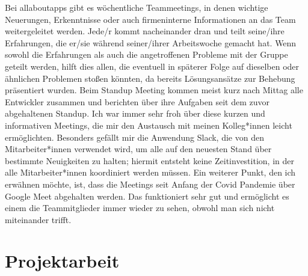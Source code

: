 Bei allaboutapps gibt es wöchentliche Teammeetings, in denen wichtige Neuerungen, Erkenntnisse oder auch firmeninterne Informationen an das Team weitergeleitet werden. Jede/r kommt nacheinander dran und teilt seine/ihre Erfahrungen, die er/sie während seiner/ihrer Arbeitswoche gemacht hat. Wenn sowohl die Erfahrungen als auch die angetroffenen Probleme mit der Gruppe geteilt werden, hilft dies allen, die eventuell in späterer Folge auf dieselben oder ähnlichen Problemen stoßen könnten, da bereits Lösungsansätze zur Behebung präsentiert wurden.\newline
Beim Standup Meeting kommen meist kurz nach Mittag alle Entwickler zusammen und berichten über ihre Aufgaben seit dem zuvor abgehaltenen Standup. Ich war immer sehr froh über diese kurzen und informativen Meetings, die mir den Austausch mit meinen Kolleg*innen leicht ermöglichten. Besonders gefällt mir die Anwendung Slack, die von den Mitarbeiter*innen verwendet wird, um alle auf den neuesten Stand über bestimmte Neuigkeiten zu halten; hiermit entsteht keine Zeitinvestition, in der alle Mitarbeiter*innen koordiniert werden müssen. Ein weiterer Punkt, den ich erwähnen möchte, ist, dass die Meetings seit Anfang der Covid Pandemie über Google Meet abgehalten werden. Das funktioniert sehr gut und ermöglicht es einem die Teammitglieder immer wieder zu sehen, obwohl man sich nicht miteinander trifft.

\section{Projektarbeit}

